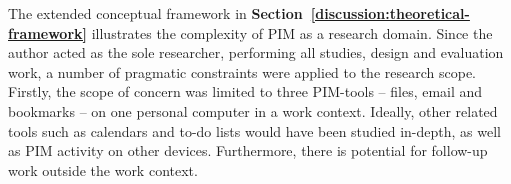 The extended conceptual framework in \textbf{Section~\ref{discussion:theoretical-framework}} illustrates the complexity of PIM as a research domain.  Since the author acted as the sole researcher, performing all studies, design and evaluation work, a number of pragmatic constraints were applied to the research scope. %
Firstly, the scope of concern was limited to three PIM-tools -- files, email and bookmarks -- on one personal computer in a work context.  Ideally, other related tools such as calendars and to-do lists would have been studied in-depth, as well as PIM activity on other devices.  Furthermore, there is potential for follow-up work outside the work context.  %











